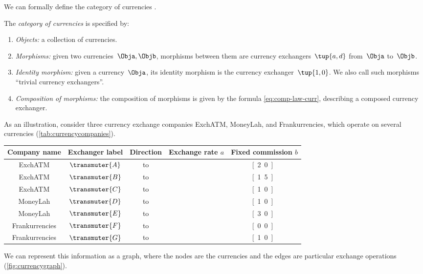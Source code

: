 We can formally define the category of currencies \Curr.

\begin{definition}
	\label{def:Curr}
	The \emph{category of currencies} \Curr is specified by:
	\begin{enumerate}
		\item \emph{Objects:} a collection of currencies.
		\item \emph{Morphisms:} given two currencies~$\Obja, \Objb$, morphisms between them are currency exchangers~$\tup{a,d}$ from~$\Obja$ to~$\Objb$.
		\item \emph{Identity morphism:} given a currency~$\Obja$, its identity morphism is the currency exchanger~$\tup{1,0}$.
		      We also call such morphisms ``trivial currency exchangers''.
		\item \emph{Composition of morphisms:} the composition of morphisms is given by the formula \cref{eq:comp-law-curr}, describing a composed currency exchanger.
	\end{enumerate}
\end{definition}

As an illustration, consider three currency exchange companies ExchATM, MoneyLah, and Frankurrencies, which operate on several currencies (\cref{tab:currencycompanies}).

\begin{table*}[h]
	\centering
	\begin{tabular}{c|c|c|c|c}
		\textbf{Company name} & \textbf{Exchanger label}      & \textbf{Direction} & \textbf{Exchange rate} $a$
		                      & \textbf{Fixed commission} $b$
		\\
		\hline
		ExchATM               & $\transmuter{A}$              & \USD to \CHF       & \unitfrac[0.95]{\chf}{\usd} & \unit[2.0]{\chf} \\
		ExchATM               & $\transmuter{B}$              & \CHF to \USD       & \unitfrac[1.05]{\usd}{\chf} & \unit[1.5]{\usd} \\
		ExchATM               & $\transmuter{C}$              & \USD to \SGD       & \unitfrac[1.40]{\sgd}{\usd} & \unit[1.0]{\sgd} \\
		MoneyLah              & $\transmuter{D}$              & \USD to \CHF       & \unitfrac[1.00]{\chf}{\usd} & \unit[1.0]{\chf} \\
		MoneyLah              & $\transmuter{E}$              & \SGD to \USD       & \unitfrac[0.72]{\usd}{\sgd} & \unit[3.0]{\usd} \\
		Frankurrencies        & $\transmuter{F}$              & \EUR to \CHF       & \unitfrac[1.20]{\chf}{\eur} & \unit[0.0]{\chf} \\
		Frankurrencies        & $\transmuter{G}$              & \CHF to \EUR       & \unitfrac[1.00]{\eur}{\chf} & \unit[1.0]{\eur}
	\end{tabular}
	\caption{Three currency exchange companies operating different currencies.
	}
	\label{tab:currencycompanies}
\end{table*}
We can represent this information as a graph, where the nodes are the currencies and the edges are particular exchange operations (\cref{fig:currencygraph}).


